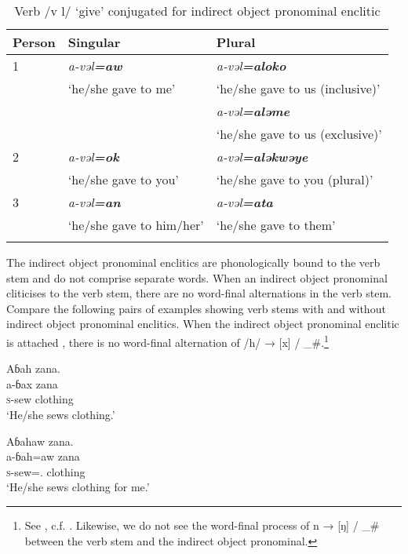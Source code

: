 \begin{table}
\begin{tabular}{lll}
\lsptoprule
{Person} & {Singular} & {Plural}\\\midrule
{1} & \textit{a-vəl\textbf{=aw}}  & \textit{a-vəl}\textbf{\textit{=aloko}}\\
& ‘he/she gave to me’ & ‘he/she gave to us (inclusive)’\\
&  & \textit{a-vəl}\textbf{\textit{=aləme}}\\
& & ‘he/she gave to us (exclusive)’\\\midrule
{2} & \textit{a-vəl}\textbf{\textit{=ok}} & \textit{a-vəl}\textbf{\textit{=aləkwəye}}\\
& ‘he/she gave to you’ & ‘he/she gave to you (plural)’\\\midrule
{3} & \textit{a-vəl}\textbf{\textit{=an}} & \textit{a-vəl}\textbf{\textit{=ata}}\\
& ‘he/she gave to him/her’ & ‘he/she gave to them’\\
\lspbottomrule
\end{tabular}
\caption{Verb /v l/ ‘give’ conjugated for indirect object pronominal enclitic\label{tab:7.58}}
\end{table}

The indirect object pronominal enclitics are phonologically bound to the verb stem  and do not comprise separate words.  When an indirect object pronominal cliticises to the verb stem, there are no word-final alternations in the verb stem. Compare the following pairs of examples showing verb stems with and without indirect object pronominal enclitics.  When the indirect object pronominal enclitic is attached , there is no word-final alternation of /h/ → [x] / \_\#.\footnote{See , c.f. . Likewise, we do not see the word-final process of n → [ŋ] /  \_\# between the verb stem and the indirect object pronominal.} 

\ea\label{ex:7:18}
Aɓah  zana.\\
\gll a-ɓax  zana\\
\textsc{s}-sew    clothing\\
\glt ‘He/she sews clothing.’
\z

\ea\label{ex:7:19}
Aɓahaw  zana.  \\
\gll a-ɓah=aw    zana  \\
\textsc{s}{}-sew={\oneS}.{\IO}   clothing    \\
\glt ‘He/she sews clothing for me.’
\z

